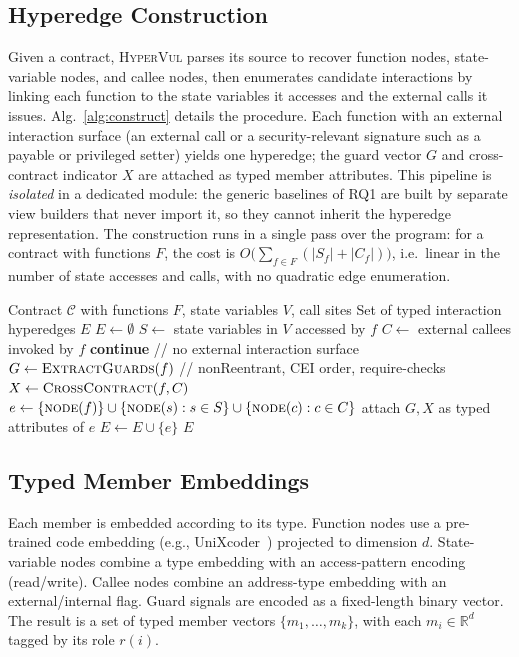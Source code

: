 \documentclass[conference]{IEEEtran}
\newcommand{\hypervul}{\textsc{HyperVul}}
\begin{document}
\subsection{Hyperedge Construction}
\label{sec:construct}
Given a contract, \hypervul{} parses its source to recover function nodes,
state-variable nodes, and callee nodes, then enumerates candidate interactions by
linking each function to the state variables it accesses and the external calls it
issues. Alg.~\ref{alg:construct} details the procedure. Each function with an external
interaction surface (an external call or a security-relevant signature such as a
payable or privileged setter) yields one hyperedge; the guard vector $G$ and
cross-contract indicator $X$ are attached as typed member attributes. This pipeline is
\emph{isolated} in a dedicated module: the generic baselines of RQ1 are built by
separate view builders that never import it, so they cannot inherit the hyperedge
representation. The construction runs in a single pass over the program: for a
contract with functions $F$, the cost is
$O\!\big(\sum_{f\in F}(|S_f| + |C_f|)\big)$, i.e.\ linear in the number of
state accesses and calls, with no quadratic edge enumeration.

\begin{algorithm}[t]
\caption{Typed hyperedge construction for a contract}
\label{alg:construct}
\begin{algorithmic}[1]
\REQUIRE Contract $\mathcal{C}$ with functions $F$, state variables $V$, call sites
\ENSURE Set of typed interaction hyperedges $E$
\STATE $E \leftarrow \emptyset$
  \STATE $S \leftarrow$ state variables in $V$ accessed by $f$
  \STATE $C \leftarrow$ external callees invoked by $f$
     \STATE \textbf{continue} \hfill // no external interaction surface
  \ENDIF
  \STATE $G \leftarrow \textsc{ExtractGuards}(f)$
     \hfill // nonReentrant, CEI order, require-checks
  \STATE $X \leftarrow \textsc{CrossContract}(f, C)$
  \STATE $e \leftarrow \{\textsc{node}(f)\}
          \cup \{\textsc{node}(s): s\in S\}
          \cup \{\textsc{node}(c): c\in C\}$
  \STATE attach $G, X$ as typed attributes of $e$
  \STATE $E \leftarrow E \cup \{e\}$
\ENDFOR
\RETURN $E$
\end{algorithmic}
\end{algorithm}

\subsection{Typed Member Embeddings}
\label{sec:embed}
Each member is embedded according to its type. Function nodes use a pre-trained code
embedding (e.g., UniXcoder~\cite{guo2022unixcoder}) projected to dimension $d$.
State-variable nodes combine a type embedding with an access-pattern encoding
(read/write). Callee nodes combine an address-type embedding with an
external/internal flag. Guard signals are encoded as a fixed-length binary vector. The
result is a set of typed member vectors $\{m_1,\dots,m_k\}$, with each $m_i\in
\mathbb{R}^d$ tagged by its role $r(i)$.
\end{document}
